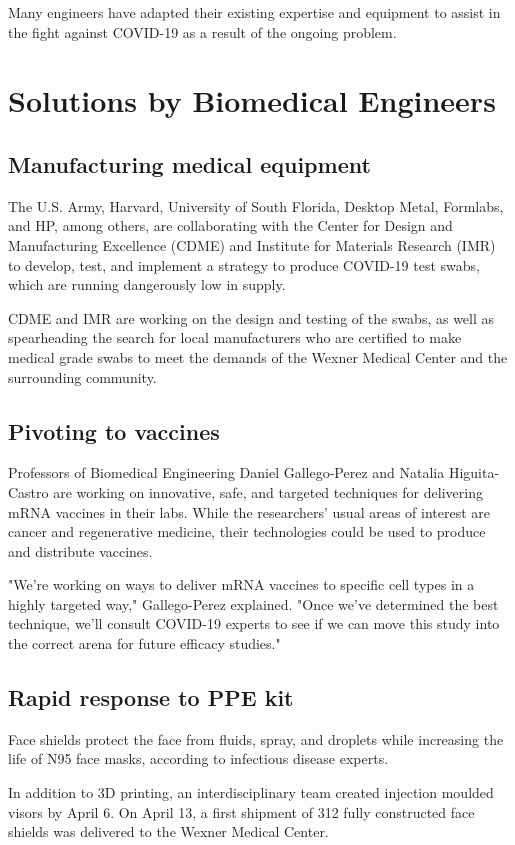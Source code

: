 \documentclass[12pt]{article}
\begin{document}
Many engineers have adapted their existing expertise and equipment to assist in the fight against COVID-19 as a result of the ongoing problem.
\section{Solutions by Biomedical Engineers}
\subsection{Manufacturing medical equipment}
The U.S. Army, Harvard, University of South Florida, Desktop Metal, Formlabs, and HP, among others, are collaborating with the Center for Design and Manufacturing Excellence (CDME) and Institute for Materials Research (IMR) to develop, test, and implement a strategy to produce COVID-19 test swabs, which are running dangerously low in supply.

CDME and IMR are working on the design and testing of the swabs, as well as spearheading the search for local manufacturers who are certified to make medical grade swabs to meet the demands of the Wexner Medical Center and the surrounding community.

\subsection{Pivoting to vaccines}
Professors of Biomedical Engineering Daniel Gallego-Perez and Natalia Higuita-Castro are working on innovative, safe, and targeted techniques for delivering mRNA vaccines in their labs. While the researchers' usual areas of interest are cancer and regenerative medicine, their technologies could be used to produce and distribute vaccines.

"We're working on ways to deliver mRNA vaccines to specific cell types in a highly targeted way," Gallego-Perez explained. "Once we've determined the best technique, we'll consult COVID-19 experts to see if we can move this study into the correct arena for future efficacy studies."
\subsection{Rapid response to PPE kit}
Face shields protect the face from fluids, spray, and droplets while increasing the life of N95 face masks, according to infectious disease experts.


In addition to 3D printing, an interdisciplinary team created injection moulded visors by April 6. On April 13, a first shipment of 312 fully constructed face shields was delivered to the Wexner Medical Center.
\end{document}
